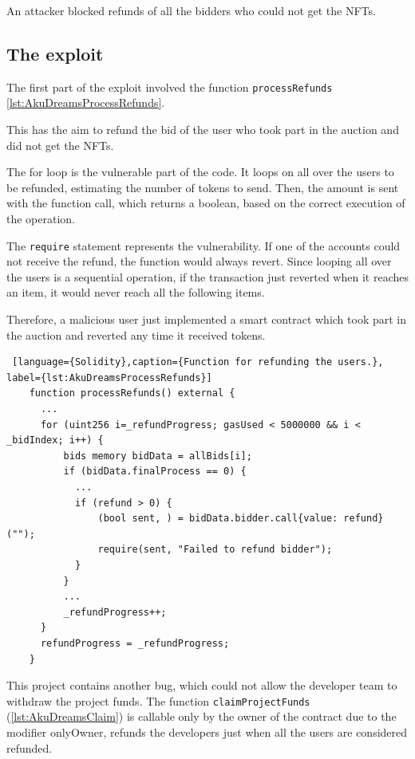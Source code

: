 An attacker blocked refunds of all the bidders who could not get the NFTs. 


\subsection{The exploit}
\label{sec:AkuDreams:AkutarsExploit}

The first part of the exploit involved the function \texttt{processRefunds} \autoref{lst:AkuDreamsProcessRefunds}.

This has the aim to refund the bid of the user who took part in the auction and did not get the NFTs. 

The for loop is the vulnerable part of the code.
It loops on all over the users to be refunded, estimating the number of tokens to send. 
Then, the amount is sent with the function call, which returns a boolean, based on the correct execution of the operation.

The \texttt{require} statement represents the vulnerability. 
If one of the accounts could not receive the refund, the function would always revert.
Since looping all over the users is a sequential operation, if the transaction just reverted when it reaches an item, it would never reach all the following items. 

Therefore, a malicious user just implemented a smart contract which took part in the auction and reverted any time it received tokens.

\begin{lstlisting} [language={Solidity},caption={Function for refunding the users.}, label={lst:AkuDreamsProcessRefunds}]
    function processRefunds() external {
      ...
      for (uint256 i=_refundProgress; gasUsed < 5000000 && i < _bidIndex; i++) {
          bids memory bidData = allBids[i];
          if (bidData.finalProcess == 0) {
            ...
            if (refund > 0) {
                (bool sent, ) = bidData.bidder.call{value: refund}("");
                require(sent, "Failed to refund bidder");
            }
          }
          ...
          _refundProgress++;
      }
      refundProgress = _refundProgress;
    }
\end{lstlisting}
 
This project contains another bug, which could not allow the developer team to withdraw the project funds.  
The function \texttt{claimProjectFunds} (\autoref{lst:AkuDreamsClaim}) is callable only by the owner of the contract due to the modifier onlyOwner, 
refunds the developers just when all the users are considered refunded. 

